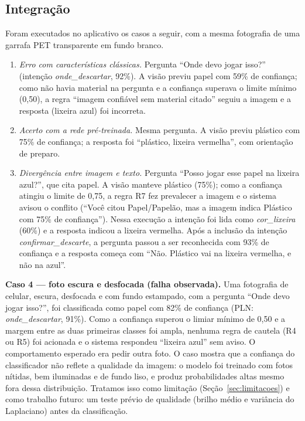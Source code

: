 \documentclass[conference]{IEEEtran}
\begin{document}
\subsection{Integração}
Foram executados no aplicativo os casos a seguir, com a mesma fotografia de uma garrafa PET transparente em fundo branco.
\begin{enumerate}
\item \emph{Erro com características clássicas.} Pergunta ``Onde devo jogar isso?'' (intenção \emph{onde\_descartar}, 92\%). A visão previu papel com 59\% de confiança; como não havia material na pergunta e a confiança superava o limite mínimo (0,50), a regra ``imagem confiável sem material citado'' seguiu a imagem e a resposta (lixeira azul) foi incorreta.
\item \emph{Acerto com a rede pré-treinada.} Mesma pergunta. A visão previu plástico com 75\% de confiança; a resposta foi ``plástico, lixeira vermelha'', com orientação de preparo.
\item \emph{Divergência entre imagem e texto.} Pergunta ``Posso jogar esse papel na lixeira azul?'', que cita papel. A visão manteve plástico (75\%); como a confiança atingiu o limite de 0,75, a regra R7 fez prevalecer a imagem e o sistema avisou o conflito (``Você citou Papel/Papelão, mas a imagem indica Plástico com 75\% de confiança''). Nessa execução a intenção foi lida como \emph{cor\_lixeira} (60\%) e a resposta indicou a lixeira vermelha. Após a inclusão da intenção \emph{confirmar\_descarte}, a pergunta passou a ser reconhecida com 93\% de confiança e a resposta começa com ``Não. Plástico vai na lixeira vermelha, e não na azul''.
\end{enumerate}
\textbf{Caso 4 --- foto escura e desfocada (falha observada).} Uma fotografia de celular, escura, desfocada e com fundo estampado, com a pergunta ``Onde devo jogar isso?'', foi classificada como papel com 82\% de confiança (PLN: \emph{onde\_descartar}, 91\%). Como a confiança superou o limiar mínimo de 0,50 e a margem entre as duas primeiras classes foi ampla, nenhuma regra de cautela (R4 ou R5) foi acionada e o sistema respondeu ``lixeira azul'' sem aviso. O comportamento esperado era pedir outra foto. O caso mostra que a confiança do classificador não reflete a qualidade da imagem: o modelo foi treinado com fotos nítidas, bem iluminadas e de fundo liso, e produz probabilidades altas mesmo fora dessa distribuição. Tratamos isso como limitação (Seção~\ref{sec:limitacoes}) e como trabalho futuro: um teste prévio de qualidade (brilho médio e variância do Laplaciano) antes da classificação.
\end{document}
